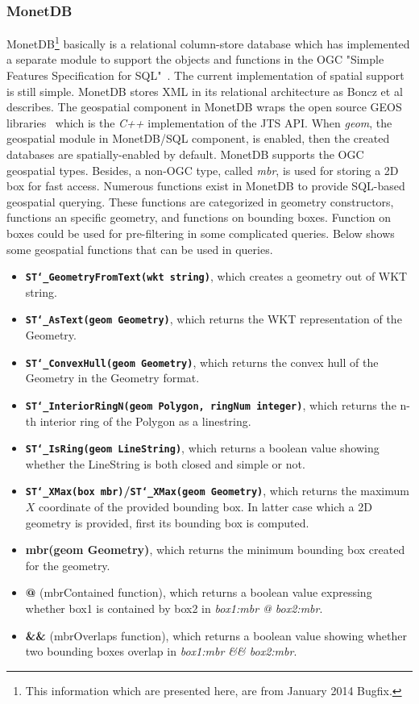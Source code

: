 \documentclass[a4paper,12pt]{article}
\begin{document}
\subsubsection{MonetDB}
MonetDB\footnote{This information which are presented here, are from January 2014 Bugfix.} basically is a relational column-store database which has implemented a separate module to support the objects and functions in the OGC "Simple Features Specification for SQL"~\cite{ogcsfs}. The current implementation of spatial support is still simple. MonetDB stores XML in its relational architecture as Boncz et al~\cite{Boncz2006} describes. The geospatial component in MonetDB wraps the open source GEOS libraries~\cite{GEOS}
which is the \textit{C++} implementation of the JTS API. When \textit{geom}, the geospatial module in MonetDB/SQL component, is enabled, then the created databases are spatially-enabled by default. MonetDB supports the OGC geospatial types. Besides, a non-OGC type, called \textit{mbr}, is used for storing a 2D box for fast access. Numerous functions exist in MonetDB to provide SQL-based geospatial querying. These functions are categorized in geometry constructors, functions an specific geometry, and functions on bounding boxes. Function on boxes could be used for pre-filtering in some complicated queries. Below shows some geospatial functions that can be used in queries.
\begin{itemize}
\item \textbf{\texttt{ST\char`_GeometryFromText(wkt string)}}, which creates a geometry out of WKT string.
\item \textbf{\texttt{ST\char`_AsText(geom Geometry)}}, which returns the WKT representation of the Geometry.
\item \textbf{\texttt{ST\char`_ConvexHull(geom Geometry)}}, which returns the convex hull of the Geometry in the Geometry format.
\item \textbf{\texttt{ST\char`_InteriorRingN(geom Polygon, ringNum integer)}}, which returns the n-th interior ring of the Polygon as a linestring.
\item \textbf{\texttt{ST\char`_IsRing(geom LineString)}}, which returns a boolean value showing whether the LineString is both closed and simple or not.
\item \textbf{\texttt{ST\char`_XMax(box mbr)}/\texttt{ST\char`_XMax(geom Geometry)}}, which returns the maximum $X$ coordinate of the provided bounding box. In latter case which a 2D geometry is provided, first its bounding box is computed.
\item \textbf{mbr(geom Geometry)}, which returns the minimum bounding box created for the geometry.
\item \textbf{@} (mbrContained function), which returns a boolean value expressing whether box1 is contained by box2 in \textit{box1:mbr @ box2:mbr}.
\item \textbf{\&\&} (mbrOverlaps function), which returns a boolean value showing whether two bounding boxes overlap in \textit{box1:mbr \&\& box2:mbr}.

\end{itemize}
\end{document}
